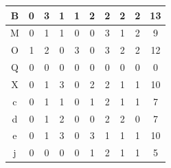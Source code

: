 \documentclass[submit,ses,noauthor]{ipsj}
\begin{document}
\begin{table}[h]
\begin{minipage}[t]{0.55\linewidth}
\begin{tabular}{c|c|cccccccc}
B                   & 0                                           & \multicolumn{1}{c|}{3} & \multicolumn{1}{c|}{1} & \multicolumn{1}{c|}{1} & \multicolumn{1}{c|}{2} & \multicolumn{1}{c|}{2} & \multicolumn{1}{c|}{2} & \multicolumn{1}{c|}{2} & 13  \\ \hline
M                   & 0                                           & \multicolumn{1}{c|}{1} & \multicolumn{1}{c|}{1} & \multicolumn{1}{c|}{0} & \multicolumn{1}{c|}{0} & \multicolumn{1}{c|}{3} & \multicolumn{1}{c|}{1} & \multicolumn{1}{c|}{2} & 9  \\ \hline
O                   & 1                                           & \multicolumn{1}{c|}{2} & \multicolumn{1}{c|}{0} & \multicolumn{1}{c|}{3} & \multicolumn{1}{c|}{0} & \multicolumn{1}{c|}{3} & \multicolumn{1}{c|}{2} & \multicolumn{1}{c|}{2} & 12  \\ \hline
Q                   & 0                                           & \multicolumn{1}{c|}{0} & \multicolumn{1}{c|}{0} & \multicolumn{1}{c|}{0} & \multicolumn{1}{c|}{0} & \multicolumn{1}{c|}{0} & \multicolumn{1}{c|}{0} & \multicolumn{1}{c|}{0} & 0  \\ \hline
X                   & 0                                           & \multicolumn{1}{c|}{1} & \multicolumn{1}{c|}{3} & \multicolumn{1}{c|}{0} & \multicolumn{1}{c|}{2} & \multicolumn{1}{c|}{2} & \multicolumn{1}{c|}{1} & \multicolumn{1}{c|}{1} & 10  \\ \hline
c                   & 0                                           & \multicolumn{1}{c|}{1} & \multicolumn{1}{c|}{1} & \multicolumn{1}{c|}{0} & \multicolumn{1}{c|}{1} & \multicolumn{1}{c|}{2} & \multicolumn{1}{c|}{1} & \multicolumn{1}{c|}{1} & 7  \\ \hline
d                   & 0                                           & \multicolumn{1}{c|}{1} & \multicolumn{1}{c|}{2} & \multicolumn{1}{c|}{0} & \multicolumn{1}{c|}{0} & \multicolumn{1}{c|}{2} & \multicolumn{1}{c|}{2} & \multicolumn{1}{c|}{0} & 7  \\ \hline
e                   & 0                                           & \multicolumn{1}{c|}{1} & \multicolumn{1}{c|}{3} & \multicolumn{1}{c|}{0} & \multicolumn{1}{c|}{3} & \multicolumn{1}{c|}{1} & \multicolumn{1}{c|}{1} & \multicolumn{1}{c|}{1} & 10  \\ \hline
j                   & 0                                           & \multicolumn{1}{c|}{0} & \multicolumn{1}{c|}{0} & \multicolumn{1}{c|}{0} & \multicolumn{1}{c|}{1} & \multicolumn{1}{c|}{2} & \multicolumn{1}{c|}{1} & \multicolumn{1}{c|}{1} & 5  \\ \hline

\end{tabular}
\end{minipage}
\end{table}
\end{document}
